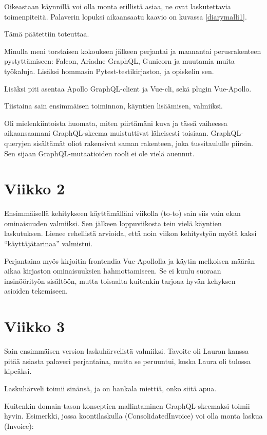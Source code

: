 Oikeastaan käynnillä voi olla monta erillistä asiaa, ne ovat
laskutettavia toimenpiteitä. Palaverin lopuksi aikaansaatu kaavio on
kuvassa \ref{diarymalli1}.

Tämä päätettiin toteuttaa.

Minulla meni torstaisen kokouksen jälkeen perjantai ja maanantai
perusrakenteen pystyttämiseen: Falcon, Ariadne GraphQL, Gunicorn ja
muutamia muita työkaluja. Lisäksi hommasin Pytest-testikirjaston, ja
opiskelin sen.

Lisäksi piti asentaa Apollo GraphQL-client ja Vue-cli, sekä plugin
Vue-Apollo.

Tiistaina sain ensimmäisen toiminnon, käyntien lisäämisen, valmiiksi.

Oli mielenkiintoista huomata, miten piirtämäni kuva ja tässä vaiheessa
aikaansaamani GraphQL-skeema muistuttivat läheisesti toisiaan.
GraphQL-queryjen sisältämät oliot rakensivat saman rakenteen, joka
tussitaululle piirsin. Sen sijaan GraphQL-mutaatioiden rooli ei ole
vielä auennut.

\hypertarget{viikko-2}{%
\section{Viikko 2}\label{viikko-2}}

Ensimmäisellä kehitykseen käyttämälläni viikolla (to-to) sain siis vain
ekan ominaisuuden valmiiksi. Sen jälkeen loppuviikosta tein vielä
käyntien laskutuksen. Lienee rehellistä arvioida, että noin viikon
kehitystyön myötä kaksi ``käyttäjätarinaa'' valmistui.

Perjantaina myös kirjoitin frontendia Vue-Apollolla ja käytin melkoisen
määrän aikaa kirjaston ominaisuuksien hahmottamiseen. Se ei kuulu
suoraan insinöörityön sisältöön, mutta toisaalta kuitenkin tarjoaa hyvän
kehyksen asioiden tekemiseen.

\hypertarget{viikko-3}{%
\section{Viikko 3}\label{viikko-3}}

Sain ensimmäisen version laskuhärvelistä valmiiksi. Tavoite oli Lauran
kanssa pitää asiasta palaveri perjantaina, mutta se peruuntui, koska
Laura oli tulossa kipeäksi.

Laskuhärveli toimii sinänsä, ja on hankala miettiä, onko siitä apua.

Kuitenkin domain-tason konseptien mallintaminen GraphQL-skeemaksi toimii
hyvin. Esimerkki, jossa koontilaskulla (ConsolidatedInvoice) voi olla
monta laskua (Invoice):

